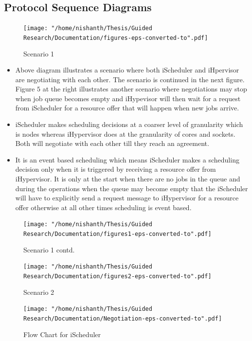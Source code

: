 \documentclass{acm_proc_article-sp}
\begin{document}
\subsection{Protocol Sequence Diagrams}
\begin{figure}[!htbp]
\centering
\texttt{[image: "/home/nishanth/Thesis/Guided Research/Documentation/figures-eps-converted-to".pdf]}
\caption{Scenario 1}
\label{fig:Seq1}
\end{figure}
\begin{itemize}
\item Above diagram illustrates a scenario where both iScheduler and iHpervisor are negotiating with each other. The scenario is continued in the next figure. Figure $5$ at the right illustrates another scenario where negotiations may stop when job queue becomes empty and iHypevisor will then wait for a request from iScheduler for a resource offer that will happen when new jobs arrive.
\item iScheduler makes scheduling decisions at a coarser level of granularity which is nodes whereas iHypervisor does at the granularity of cores and sockets. Both will negotiate with each other till they reach an agreement.
\item It is an event based scheduling which means iScheduler makes a scheduling decision only when it is triggered by receiving a resource offer from iHypervisor. It is only at the start when there are no jobs in the queue and during the operations when the queue may become empty that the iScheduler will have to explicitly send a request message to iHypervisor for a resource offer otherwise at all other times scheduling is event based.
\end{itemize}
\begin{figure}[t]
\centering
\texttt{[image: "/home/nishanth/Thesis/Guided Research/Documentation/figures1-eps-converted-to".pdf]}
\caption{Scenario 1 contd.}
\label{fig:Seq2}
\end{figure}
\begin{figure}[!htbp]
\centering
\texttt{[image: "/home/nishanth/Thesis/Guided Research/Documentation/figures2-eps-converted-to".pdf]}
\caption{Scenario 2}
\label{fig:Seq3}
\end{figure}
\begin{figure}[t]
\texttt{[image: "/home/nishanth/Thesis/Guided Research/Documentation/Negotiation-eps-converted-to".pdf]}
\caption{Flow Chart for iScheduler}
\label{fig:iScheduler}
\end{figure}
\end{document}
